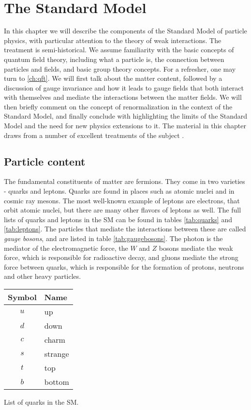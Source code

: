 \chapter{The Standard Model}\label{ch:sm}
In this chapter we will describe the components of the Standard Model of particle physics, with particular attention to the theory of weak interactions. The treatment is semi-historical. We assume familiarity with the basic concepts of quantum field theory, including what a particle is, the connection between particles and fields, and basic group theory concepts. For a refresher, one may turn to \autoref{ch:qft}. We will first talk about the matter content, followed by a discussion of gauge invariance and how it leads to gauge fields that both interact with themselves and mediate the interactions between the matter fields. We will then briefly comment on the concept of renormalization in the context of the Standard Model, and finally conclude with highlighting the limits of the Standard Model and the need for new physics extensions to it. The material in this chapter draws from a number of excellent treatments of the subject \citep{Cheng1985,Schwartz2014,Zee2010,Peskin:1995ev}.

\section{Particle content}
The fundamental constituents of matter are fermions. They come in two varieties - quarks and leptons. Quarks are found in places such as atomic nuclei and in cosmic ray mesons. The most well-known example of leptons are electrons, that orbit atomic nuclei, but there are many other flavors of leptons as well. The full lists of quarks and leptons in the SM can be found in tables \ref{tab:quarks} and \ref{tab:leptons}. The particles that mediate the interactions between these are called \emph{gauge bosons}, and are listed in table \ref{tab:gaugebosons}. The photon is the mediator of the electromagnetic force, the $W$ and $Z$ bosons mediate the weak force, which is responsible for radioactive decay, and gluons mediate the strong force between quarks, which is responsible for the formation of protons, neutrons and other heavy particles.

\begin{margintable}[-10cm]
  \centering
  \begin{tabular}{c|l}
    Symbol & Name \\
  \hline
    $u$ & up\\
    $d$ & down \\
    $c$ & charm \\
    $s$ & strange \\
    $t$ & top \\
    $b$ & bottom \\
  \end{tabular}
  \caption{List of quarks in the SM.}
  \label{tab:quarks}
\end{margintable}

